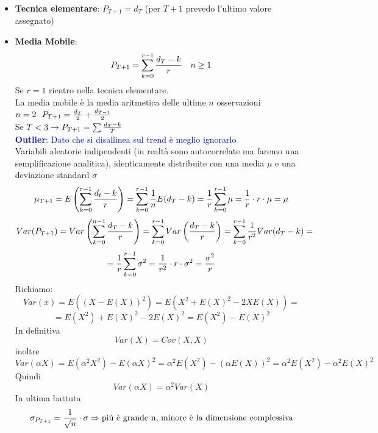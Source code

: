 \documentclass[12pt,a4paper]{article}
\begin{document}
\begin{itemize}
\item \textbf{Tecnica elementare}: $P_{T+1} = d_T$ (per $T+1$ prevedo l'ultimo valore assegnato)
\item \textbf{Media Mobile}: $$P_{T+1} = \sum_{k=0}^{r-1} {d_T - k \over r} \ \ \ n \geq 1$$ Se $r=1$ rientro nella tecnica elementare.\\
La media mobile è la media aritmetica delle ultime $n$ osservazioni\\
$n=2 \ \ P_{T+1} = {d_T \over 2} + {d_{T-1} \over2}$\\
Se $T < 3 \rightarrow P_{T+1} = \sum {d_T -k \over T}$\\
\textcolor{blue}{\textbf{Outlier}: Dato che si disallinea sul trend è meglio ignorarlo}\\
Variabili aleatorie indipendenti (in realtà sono autocorrelate ma faremo una semplificazione analitica), identicamente distribuite con una media $\mu$ e una deviazione standard $\sigma$\\
$$\mu_{T+1} = E\left(\sum_{k=0}^{r-1}{d_t - k \over r}\right) =  \sum_{k=0}^{r-1}{1 \over n} E(d_T - k) = {1 \over r}\sum_{k=0}^{r-1}\mu = {1\over r}\cdot r\cdot \mu = \mu$$
$$Var(P_{T+1}) = Var\left(\sum_{k=0}^{n-1}{d_T - k \over r}\right) = \sum_{k=0}^{r-1} Var \left({d_T - k\over r}\right) = \sum_{k=0}^{r-1} {1\over r^2} Var(d_T -k)=$$ $$= {1\over r}\sum_{k=0}^{r-1} \sigma^2 = {1 \over r^2}\cdot r \cdot \sigma^2 = {\sigma^2 \over r}$$
Richiamo:
$$Var(x) = E((X-E(X))^2) = E(X^2+E(X)^2 - 2XE(X)) =$$ $$= E(X^2) + E(X)^2 - 2E(X)^2 = E(X^2) - E(X)^2$$
In definitiva $$Var(X) = Cov(X,X)$$
inoltre $$Var(\alpha X) = E(\alpha^2X^2)-E(\alpha X)^2 = \alpha^2E(X^2) - (\alpha E(X))^2 = \alpha^2 E(X^2) - \alpha^2E(X)^2$$
Quindi $$Var(\alpha X) = \alpha^2 Var(X)$$
In ultima battuta $$\sigma_{P_{T+1}} = {1 \over \sqrt{n}}\cdot \sigma \Rightarrow \text{più è grande n, minore è la dimensione complessiva}$$


\end{itemize}
\end{document}

